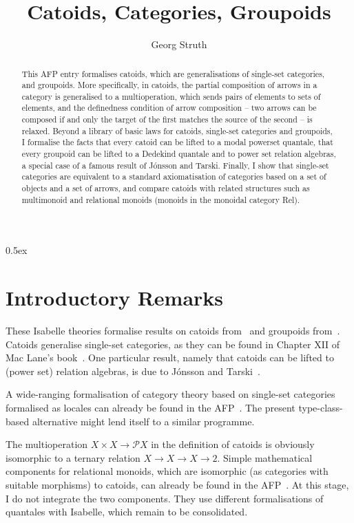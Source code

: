 \documentclass[11pt,a4paper]{article}
\begin{document}
\title{Catoids, Categories, Groupoids}
\author{Georg Struth}
\maketitle

\begin{abstract}
  This AFP entry formalises catoids, which are generalisations of
  single-set categories, and groupoids. More specifically, in catoids,
  the partial composition of arrows in a category is generalised to a
  multioperation, which sends pairs of elements to sets of elements,
  and the definedness condition of arrow composition -- two arrows can
  be composed if and only the target of the first matches the source
  of the second -- is relaxed. Beyond a library of basic laws for
  catoids, single-set categories and groupoids, I formalise the facts
  that every catoid can be lifted to a modal powerset quantale, that
  every groupoid can be lifted to a Dedekind quantale and to power set
  relation algebras, a special case of a famous result of Jónsson and
  Tarski. Finally, I show that single-set categories are equivalent to
  a standard axiomatisation of categories based on a set of objects
  and a set of arrows, and compare catoids with related structures
  such as multimonoid and relational monoids (monoids in the monoidal
  category Rel).
\end{abstract}

\tableofcontents

\parindent 0pt\parskip 0.5ex

\section{Introductory Remarks}

These Isabelle theories formalise results on catoids
from~\cite{CranchDS20,CalkFJSZ21,FahrenbergJSZ23} and groupoids
from~\cite{CalkMPS23}. Catoids generalise single-set categories, as
they can be found in Chapter XII of Mac Lane's
book~\cite{MacLane98}. One particular result, namely that catoids can
be lifted to (power set) relation algebras, is due to Jónsson and
Tarski~\cite{JonssonT52}.

A wide-ranging formalisation of category theory
based on single-set categories formalised as locales can already be
found in the AFP~\cite{Stark16}. The present type-class-based alternative
might lend itself to a similar programme.

The multioperation $X\times X\to \mathcal{P} X$ in the definition of
catoids is obviously isomorphic to a ternary relation
$X\to X\to X\to 2$. Simple mathematical components for relational
monoids, which are isomorphic (as categories with suitable morphisms)
to catoids, can already be found in the AFP~\cite{DongolGHS17}. At
this stage, I do not integrate the two components. They use different
formalisations of quantales with Isabelle, which remain to be
consolidated.
\end{document}
